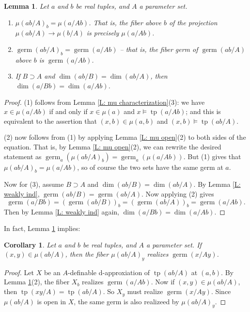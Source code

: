 \documentclass{amsart}
\newtheorem{lemma}[theorem]{Lemma}
\newtheorem{corollary}[theorem]{Corollary}
\theoremstyle{definition}
\newcommand{\tp}{\operatorname{tp}}
\begin{document}
    \begin{lemma}\label{L: fiber germ equation}
        Let $a$ and $b$ be real tuples, and $A$ a parameter set.
        \begin{enumerate}
            \item $\mu(ab/A)_b=\mu(a/Ab)$. That is, the fiber above $b$ of the projection $\mu(ab/A)\rightarrow\mu(b/A)$ is precisely $\mu(a/Ab)$.
            \item $\operatorname{germ}(ab/A)_b=\operatorname{germ}(a/Ab)$ -- that is, the fiber germ of $\operatorname{germ}(ab/A)$ above $b$ is $\operatorname{germ}(a/Ab)$.
            \item If $B\supset A$ and $\dim(ab/B)=\dim(ab/A)$, then $\dim(a/Bb)=\dim(a/Ab)$.
            \end{enumerate}
    \end{lemma}

    \begin{proof} (1) follows from Lemma \ref{L: mu characterization}(3): we have $x\in\mu(a/Ab)$ if and only if $x\in\mu(a)$ and $x\models\tp(a/Ab)$; and this is equivalent to the assertion that $(x,b)\in\mu(a,b)$ and $(x,b)\models\tp(ab/A)$. 
    
    (2) now follows from (1) by applying Lemma \ref{L: mu open}(2) to both sides of the equation. That is, by Lemma \ref{L: mu open}(2), we can rewrite the desired statement as $\operatorname{germ}_a(\mu(ab/A)_b)=\operatorname{germ}_a(\mu(a/Ab))$. But (1) gives that $\mu(ab/A)_b=\mu(a/Ab)$, so of course the two sets have the same germ at $a$.
    
     Now for (3), assume $B\supset A$ and $\dim(ab/B)=\dim(ab/A)$. By Lemma \ref{L: weakly ind}, $\operatorname{germ}(ab/B)=\operatorname{germ}(ab/A)$. Now applying (2) gives $$\operatorname{germ}(a/Bb)=(\operatorname{germ}(ab/B))_b=(\operatorname{germ}(ab/A))_b=\operatorname{germ}(a/Ab).$$ Then by Lemma \ref{L: weakly ind} again, $\dim(a/Bb)=\dim(a/Ab)$.
     \end{proof}

     In fact, Lemma \ref{L: fiber germ equation} implies:

     \begin{corollary}\label{C: fiber germ}
         Let $a$ and $b$ be real tuples, and $A$ a parameter set. If $(x,y)\in\mu(ab/A)$, then the fiber $\mu(ab/A)_y$ realizes $\operatorname{germ}(x/Ay)$.
     \end{corollary}
     \begin{proof}
         Let $X$ be an $A$-definable d-approxiation of $\tp(ab/A)$ at $(a,b)$. By Lemma \ref{L: fiber germ equation}(2), the fiber $X_b$ realizes $\operatorname{germ}(a/Ab)$. Now if $(x,y)\in\mu(ab/A)$, then $\tp(xy/A)=\tp(ab/A)$. So $X_y$ must realize $\operatorname{germ}(x/Ay)$. Since $\mu(ab/A)$ is open in $X$, the same germ is also realizeed by $\mu(ab/A)_y$.
     \end{proof}
\end{document}
